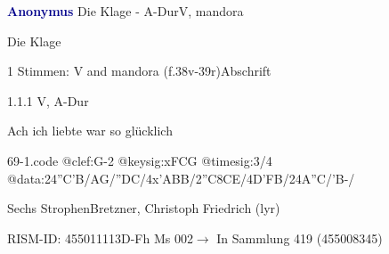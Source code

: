 \documentclass[twocolumn]{book}
\begin{document}
\par \vspace{7pt} \textcolor{darkblue}{\textbf{Anonymus  }}\hfillplus{\textbf{[69]}}\newline Die Klage - A-Dur\newline V, mandora
\par \begin{itshape}[heading, f.38v:] Die Klage\end{itshape} 
\par \textcolor{darkblue}{}  1 Stimmen: V and mandora  (f.38v-39r)\newline Abschrift
\par 1.1.1  V, A-Dur\newline \begin{footnotesize} Ach ich liebte war so glücklich \end{footnotesize}  
\begin{filecontents*}{69-1.code}
@clef:G-2
@keysig:xFCG
@timesig:3/4
@data:24''C'B/AG/''DC/4x'ABB/2''C{8CE}/4D'FB/24A''C/'B-/
\end{filecontents*}
\newline
%
\par Sechs Strophen\newline Bretzner, Christoph Friedrich  (lyr)
\par RISM-ID: 455011113\newline D-Fh  Ms 002\newline $\rightarrow$ In Sammlung 419 (455008345)
      
\end{document}
